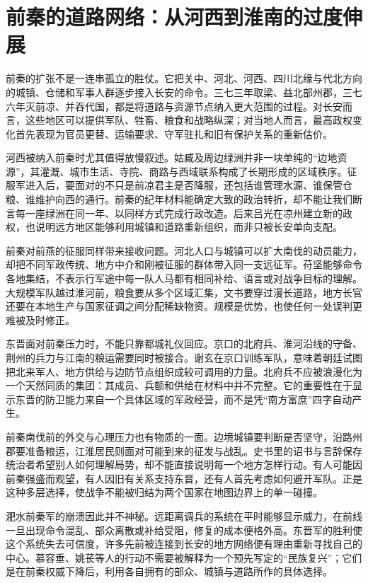 \section{前秦的道路网络：从河西到淮南的过度伸展}
\label{sec:eastern-jin-depth-former-qin}

前秦的扩张不是一连串孤立的胜仗。它把关中、河北、河西、四川北缘与代北方向的城镇、仓储和军事人群逐步接入长安的命令。三七三年取梁、益北部州郡，三七六年灭前凉、并吞代国，都是将道路与资源节点纳入更大范围的过程。对长安而言，这些地区可以提供军队、牲畜、粮食和战略纵深；对当地人而言，最高政权变化首先表现为官员更替、运输要求、守军驻扎和旧有保护关系的重新估价。

河西被纳入前秦时尤其值得放慢叙述。姑臧及周边绿洲并非一块单纯的“边地资源”，其灌溉、城市生活、寺院、商路与西域联系构成了长期形成的区域秩序。征服军进入后，要面对的不只是前凉君主是否降服，还包括谁管理水源、谁保管仓粮、谁维护向西的通行。前秦的纪年材料能确定大致的政治转折，却不能让我们断言每一座绿洲在同一年、以同样方式完成行政改造。后来吕光在凉州建立新的政权，也说明远方地区能够利用城镇和道路重新组织，而非只被长安单向支配。

前秦对前燕的征服同样带来接收问题。河北人口与城镇可以扩大南伐的动员能力，却把不同军政传统、地方中介和刚被征服的群体带入同一支远征军。苻坚能够命令各地集结，不表示行军途中每一队人马都有相同补给、语言或对战争目标的理解。大规模军队越过淮河前，粮食要从多个区域汇集，文书要穿过漫长道路，地方长官还要在本地生产与国家征调之间分配稀缺物资。规模是优势，也使任何一处误判更难被及时修正。

东晋面对前秦压力时，不能只靠都城礼仪回应。京口的北府兵、淮河沿线的守备、荆州的兵力与江南的粮运需要同时被接合。谢玄在京口训练军队，意味着朝廷试图把北来军人、地方供给与边防节点组织成较可调用的力量。北府兵不应被浪漫化为一个天然同质的集团：其成员、兵额和供给在材料中并不完整。它的重要性在于显示东晋的防卫能力来自一个具体区域的军政经营，而不是凭“南方富庶”四字自动产生。

前秦南伐前的外交与心理压力也有物质的一面。边境城镇要判断是否坚守，沿路州郡要准备粮运，江淮居民则面对可能到来的征发与战乱。史书里的诏书与言辞保存统治者希望别人如何理解局势，却不能直接说明每一个地方怎样行动。有人可能因前秦强盛而观望，有人因旧有关系支持东晋，还有人首先考虑如何避开军队。正是这种多层选择，使战争不能被归结为两个国家在地图边界上的单一碰撞。

淝水前秦军的崩溃因此并不神秘。远距离调兵的系统在平时能够显示威力，在前线一旦出现命令混乱、部众离散或补给受阻，修复的成本便格外高。东晋军的胜利使这个系统失去可信度，许多先前被连接到长安的地方网络便有理由重新寻找自己的中心。慕容垂、姚苌等人的行动不需要被解释为一个预先写定的“民族复兴”；它们是在前秦权威下降后，利用各自拥有的部众、城镇与道路所作的具体选择。

